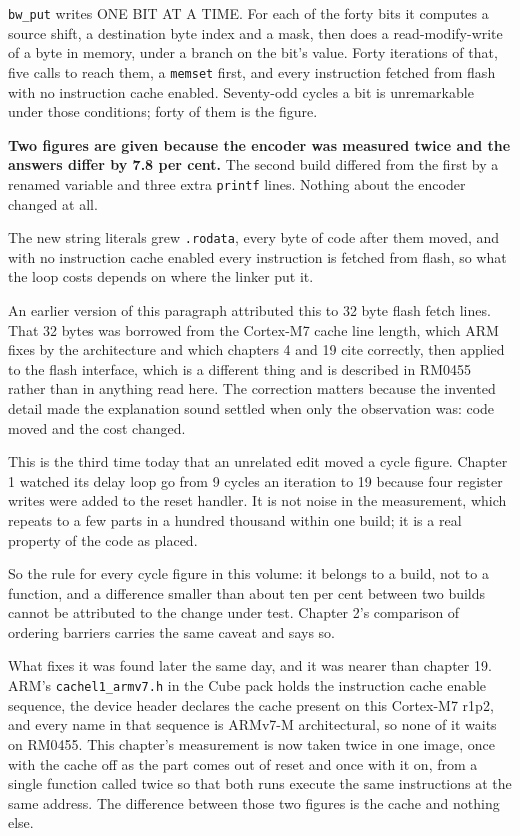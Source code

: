 \texttt{bw\_put} writes ONE BIT AT A TIME. For each of the forty bits it computes a
source shift, a destination byte index and a mask, then does a read-modify-write of
a byte in memory, under a branch on the bit's value. Forty iterations of that, five
calls to reach them, a \texttt{memset} first, and every instruction fetched from
flash with no instruction cache enabled. Seventy-odd cycles a bit is unremarkable
under those conditions; forty of them is the figure.

\textbf{Two figures are given because the encoder was measured twice and the
answers differ by 7.8 per cent.} The second build differed from the first by a
renamed variable and three extra \texttt{printf} lines. Nothing about the encoder
changed at all.

The new string literals grew \texttt{.rodata}, every byte of code after them moved,
and with no instruction cache enabled every instruction is fetched from flash, so
what the loop costs depends on where the linker put it.

An earlier version of this paragraph attributed this to 32 byte flash fetch lines.
That 32 bytes was borrowed from the Cortex-M7 cache line length, which ARM fixes by
the architecture and which chapters 4 and 19 cite correctly, then applied to the
flash interface, which is a different thing and is described in RM0455 rather than
in anything read here. The correction matters because the invented detail made the
explanation sound settled when only the observation was: code moved and the cost
changed.

This is the third time today that an unrelated edit moved a cycle figure. Chapter 1
watched its delay loop go from 9 cycles an iteration to 19 because four register
writes were added to the reset handler. It is not noise in the measurement, which
repeats to a few parts in a hundred thousand within one build; it is a real
property of the code as placed.

So the rule for every cycle figure in this volume: it belongs to a build, not to a
function, and a difference smaller than about ten per cent between two builds
cannot be attributed to the change under test. Chapter 2's comparison of ordering
barriers carries the same caveat and says so.

What fixes it was found later the same day, and it was nearer than chapter 19.
ARM's \texttt{cachel1\_armv7.h} in the Cube pack holds the instruction cache enable
sequence, the device header declares the cache present on this Cortex-M7 r1p2, and
every name in that sequence is ARMv7-M architectural, so none of it waits on
RM0455. This chapter's measurement is now taken twice in one image, once with the
cache off as the part comes out of reset and once with it on, from a single
function called twice so that both runs execute the same instructions at the same
address. The difference between those two figures is the cache and nothing else.

